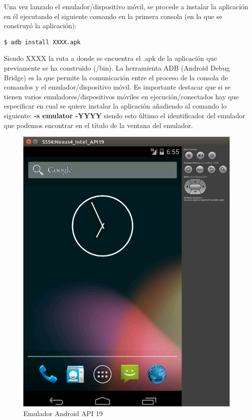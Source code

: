      Una vez lanzado el emulador/dispositivo móvil, se procede a instalar la aplicación en él ejecutando el siguiente comando en la primera consola (en la que se construyó la aplicación):
		      	 
 	 \begin{lstlisting}[style=console, numbers=none]
		$ adb install XXXX.apk
	 \end{lstlisting}		
 	 
 	 Siendo XXXX la ruta a donde se encuentra el .apk de la aplicación que previamente se ha construido (/bin). La herramienta ADB (Android Debug Bridge) \cite{ref:android_adb} es la que permite la comunicación entre el proceso de la consola de comandos y el emulador/dispositivo móvil. Es importante destacar que si se tienen varios emuladores/dispositivos móviles en ejecución/conectados hay que especificar en cual se quiere instalar la aplicación añadiendo al comando lo siguiente: \textbf{-s emulator -YYYY} siendo esto último el identificador del emulador que podemos encontrar en el título de la ventana del emulador. 
	     
	\begin{figure}[H]
      \centering
	\includegraphics[keepaspectratio, scale=0.3]{Media/Captures/emulator_api_19.png}
      \caption{Emulador Android API 19}
      \label{fig:android_emulator19}
    \end{figure} 
    
